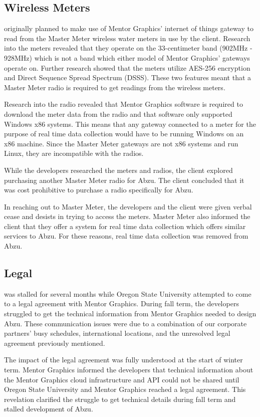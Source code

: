 \documentclass[journal]{IEEEtran}
\begin{document}
\subsection{Wireless Meters}
 originally planned to make use of Mentor Graphics' internet of things gateway to read from the Master Meter wireless water meters in use by the client. Research into the meters revealed that they operate on the 33-centimeter band (902MHz - 928MHz) which is not a band which either model of Mentor Graphics' gateways operate on. Further research showed that the meters utilize AES-256 encryption and Direct Sequence Spread Spectrum (DSSS). These two features meant that a Master Meter radio is required to get readings from the wireless meters.

Research into the radio revealed that Mentor Graphics software is required to download the meter data from the radio and that software only supported Windows x86 systems. This means that any gateway connected to a meter for the purpose of real time data collection would have to be running Windows on an x86 machine. Since the Master Meter gateways are not x86 systems and run Linux, they are incompatible with the radios.

While the developers researched the meters and radios, the client explored purchasing another Master Meter radio for Abzu. The client concluded that it was cost prohibitive to purchase a radio specifically for Abzu.

In reaching out to Master Meter, the developers and the client were given verbal cease and desists in trying to access the meters. Master Meter also informed the client that they offer a system for real time data collection which offers similar services to Abzu. For these reasons, real time data collection was removed from Abzu.

\subsection{Legal}
 was stalled for several months while Oregon State University attempted to come to a legal agreement with Mentor Graphics. During fall term, the developers struggled to get the technical information from Mentor Graphics needed to design Abzu. These communication issues were due to a combination of our corporate partners' busy schedules, international locations, and the unresolved legal agreement previously mentioned.

The impact of the legal agreement was fully understood at the start of winter term. Mentor Graphics informed the developers that technical information about the Mentor Graphics cloud infrastructure and API could not be shared until Oregon State University and Mentor Graphics reached a legal agreement. This revelation clarified the struggle to get technical details during fall term and stalled development of Abzu.
\end{document}
